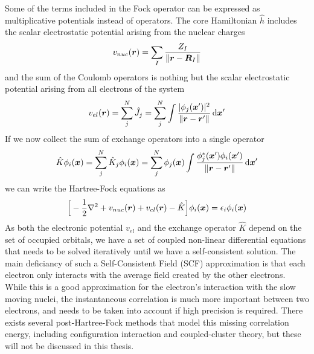 Some of the terms included in the Fock operator can be expressed as multiplicative
potentials instead of operators. The core Hamiltonian $\hat{h}$ includes the scalar 
electrostatic potential arising from the nuclear charges
\begin{equation}
    v_{nuc}(\boldsymbol r) = \sum_{I} \frac{Z_I}{\|\boldsymbol r - \boldsymbol R_I\|}
\end{equation}
and the sum of the Coulomb operators is nothing but the scalar electrostatic potential
arising from all electrons of the system
\begin{equation}
    v_{el}(\boldsymbol r) = \sum_j^N \hat{J}_j = \sum_j^N \int \frac{|\phi_j(\boldsymbol x')|^2}
	{\|\boldsymbol r - \boldsymbol r'\|} \,\mathrm{d} \boldsymbol x'
\end{equation}
If we now collect the sum of exchange operators into a single operator
\begin{equation}
    \hat{K}\phi_i(\boldsymbol x) = \sum_j^N \hat{K}_j \phi_i(\boldsymbol x) 
	= \sum_j^N \phi_j (\boldsymbol x) \int \frac{\phi_j^{\ast}(\boldsymbol x')\phi_i(\boldsymbol x')}
	    {\|\boldsymbol r - \boldsymbol r'\|} \,\mathrm{d} \boldsymbol x'
\end{equation}
we can write the Hartree-Fock equations as
\begin{equation}
    \label{eq:HF_equations}
    \Big[-\frac{1}{2}\nabla^2 + v_{nuc}(\boldsymbol r) + v_{el}(\boldsymbol r) - \hat{K}\Big]\phi_i(\boldsymbol x) 
	= \epsilon_i \phi_i(\boldsymbol x)
\end{equation}
As both the electronic potential $v_{el}$ and the exchange operator $\hat{K}$ depend on the set of
occupied orbitals, we have a set of coupled non-linear differential equations that needs to
be solved iteratively until we have a self-consistent solution. The main deficiancy of such
a Self-Consistent Field (SCF) approximation is that each electron only interacts with the average field
created by the other electrons. While this is a good approximation for the electron's interaction
with the slow moving nuclei, the instantaneous correlation is much more important between two electrons,
and needs to be taken into account if high precision is required. There exists several post-Hartree-Fock
methods that model this missing correlation energy, including configuration interaction and coupled-cluster
theory, but these will not be discussed in this thesis.

